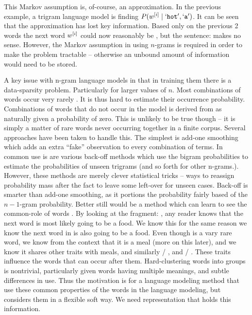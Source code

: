 \documentclass[parskip]{komatufte}
\begin{document}
This Markov assumption is, of-course, an approximation.
In the previous example, a trigram language model is finding $P(\n w_i \mid \natlang{hot}, \natlang{a})$.
It can be seen that the approximation has lost key information.
Based only on the previous 2 words the next word $\n w_i$ could now reasonably be , but the sentence:  makes no sense.
However, the Markov assumption in using $n$-grams is required in order to make the problem tractable -- otherwise an unbound amount of information would need to be stored. 

A key issue with n-gram language models in that in training them there is a data-sparsity problem.
Particularly for larger values of $n$.
Most combinations of words occur very rarely .
It is thus hard to estimate their occurrence probability.
Combinations of words that do not occur in the model is derived from as naturally given a probability of zero.
This is unlikely to be true though -- it is simply a matter of rare words never occurring together in a finite corpus.
Several approaches have been taken to handle this.
The simplest is add-one smoothing which adds an extra ``fake'' observation to every combination of terms.
In common use is are various back-off methods  which use the bigram probabilities to estimate the probabilities of unseen trigrams (and so forth for other n-grams.).
%
%
However, these methods are merely clever statistical tricks -- ways to reassign probability mass after the fact to leave some left-over for unseen cases.
Back-off is smarter than add-one smoothing, as it portions the probability fairly based of the $n{-}1$-gram probability.
Better still would be a method which can learn to see the common-role of words .
By looking at the fragment: , any reader knows that the next word is most likely going to be a food.
We know this for the same reason we know the next word in  is also going to be a food.
Even though  is a vary rare word, we know from the context that it is a meal (more on this later), and we know it shares other traits with meals, and similarly  / , and  / .
These traits influence the words that can occur after them.
Hard-clustering words into groups is nontrivial, particularly given words having multiple meanings, and subtle differences in use.
Thus the motivation is for a language modeling method that use these common properties of the words in the language modeling, but considers them in a flexible soft way.
We need representation that holds this information.
\end{document}
